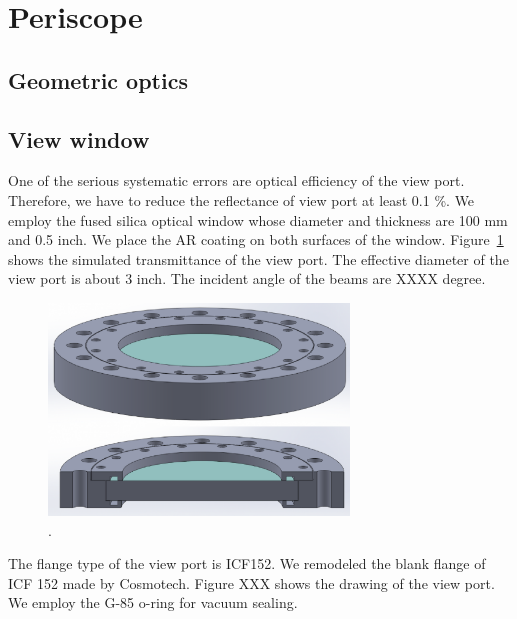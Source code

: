 \section{Periscope}
\subsection{Geometric optics}
\subsection{View window}
One of the serious systematic errors are optical efficiency of the view port. Therefore, we have to reduce the reflectance of  view port at least 0.1 \%. We employ the fused silica optical window whose diameter and thickness are 100 mm and 0.5 inch. We place the AR coating on both surfaces of the window. Figure~\ref{fig:Pcal_window} shows the simulated transmittance of the view port. The effective diameter of the view port is about 3 inch. The incident angle of the beams are XXXX degree. 

\begin{figure}
\begin{center}
\includegraphics[width=8cm]{Figures/Pcal_view_window.eps}
\caption{.} 
\label{fig:Pcal_window} 
\end{center}
\end{figure}

The flange type of the view port is ICF152. We remodeled the blank flange of ICF 152 made by Cosmotech. Figure XXX shows the drawing of the view port. We employ the G-85 o-ring for vacuum sealing. 
